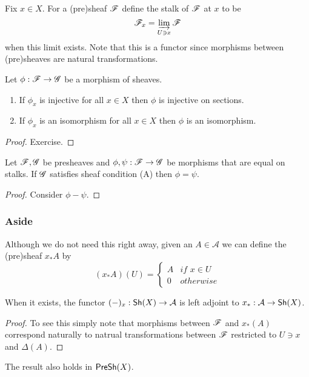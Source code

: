 \documentclass{memoir}
\begin{document}
Fix $x\in X$.
For a (pre)sheaf $\mathscr{F}$ define the stalk of $\mathscr{F}$ at $x$ to be 
\begin{equation}
    \mathscr{F}_x = \varinjlim_{U\ni x}\mathscr{F}
\end{equation}
when this limit exists. Note that this is a functor since morphisms between (pre)sheaves are natural transformations.
\begin{thm}
    Let $\phi:\mathscr{F}\to \mathscr{G}$ be a morphism of sheaves.
    \begin{enumerate}
        \item If $\phi_x$ is injective for all $x\in X$ then $\phi$ is injective on sections.
        \item If $\phi_x$ is an isomorphism for all $x\in X$ then $\phi$ is an isomorphism.
    \end{enumerate}
\end{thm}
\begin{proof}
Exercise.
\end{proof}
\begin{proposition}
    Let $\mathscr{F},\mathscr{G}$ be presheaves and $\phi,\psi:\mathscr{F}\to\mathscr{G}$ be morphisms that are equal on stalks.
    If $\mathscr{G}$ satisfies sheaf condition (A) then $\phi = \psi$.
\end{proposition}
\begin{proof}
    Consider $\phi-\psi$.
\end{proof}
\subsubsection{Aside}
Although we do not need this right away, given an $A\in \mathcal A$ we can define the (pre)sheaf $x_*A$ by 
\begin{equation}
    (x_*A)(U) = \begin{cases}
        A & \textit{if } x\in U \\
        0 & otherwise
    \end{cases}
\end{equation}
\begin{proposition}
    When it exists, the functor $(-)_x:{\normalfont\mathsf{Sh}}(X)\to \mathcal A$ is left adjoint to $x_*:\mathcal A\to {\normalfont\mathsf{Sh}}(X)$.
\end{proposition}
\begin{proof}
    To see this simply note that morphisms between $\mathscr{F}$ and $x_*(A)$ correspond naturally to natrual transformations between $\mathscr{F}$ restricted to $U\ni x$ and $\Delta(A)$.
\end{proof}
\begin{remark}
    The result also holds in ${\normalfont\mathsf{PreSh}}(X)$.
\end{remark}
\end{document}

